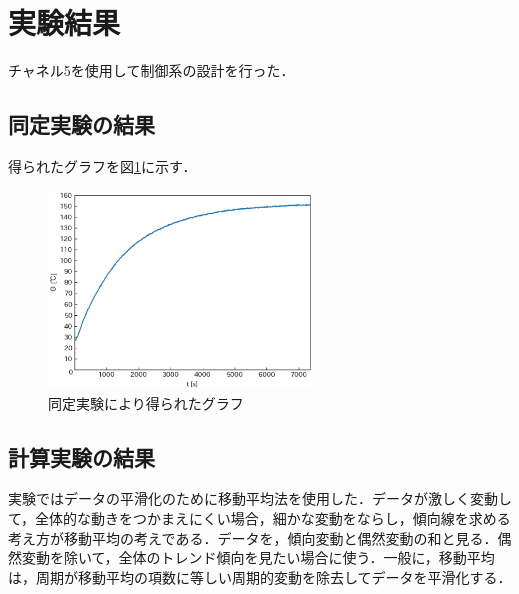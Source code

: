 \documentclass[12pt]{jsarticle}
\begin{document}
\section{実験結果}
チャネル5を使用して制御系の設計を行った．
\subsection{同定実験の結果}
得られたグラフを図\ref{identification_EXP}に示す．
\begin{figure}[tb]
  \begin{center}
    \includegraphics[clip,width=7.0cm]{../graph/identification.eps}
    \caption{同定実験により得られたグラフ}
    \label{identification_EXP}
  \end{center}
\end{figure}

\subsection{計算実験の結果}
実験ではデータの平滑化のために移動平均法を使用した．データが激しく変動して，全体的な動きをつかまえにくい場合，細かな変動をならし，傾向線を求める考え方が移動平均の考えである．データを，傾向変動と偶然変動の和と見る．偶然変動を除いて，全体のトレンド傾向を見たい場合に使う．一般に，移動平均は，周期が移動平均の項数に等しい周期的変動を除去してデータを平滑化する\cite{moving_average}．
\end{document}
